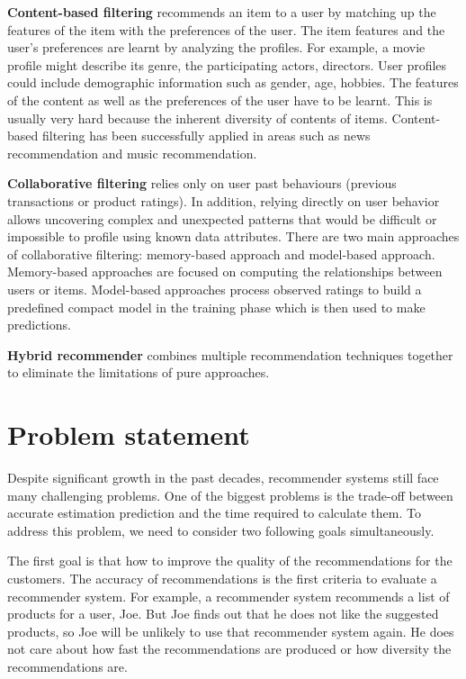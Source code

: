 \documentclass[oneside,13pt]{extreport}
\begin{document}
\begin{description}
    \item{\textbf{Content-based filtering}} recommends an item to a user by matching up the features of the item with the preferences of the user. The item features and the user's preferences are learnt by analyzing the profiles. For example, a movie profile might describe its genre, the participating actors, directors. User profiles could include demographic information such as gender, age, hobbies. The features of the content as well as the preferences of the user have to be learnt. This is usually very hard because the inherent diversity of contents of items. Content-based filtering has been successfully applied in areas such as news recommendation and music recommendation.
    \item{\textbf{Collaborative filtering}} relies only on user past behaviours (previous transactions or product ratings). In addition, relying directly on user behavior allows uncovering complex and unexpected patterns that would be difficult or impossible to profile using known data attributes\cite{BellKorFactor}. There are two main approaches of collaborative filtering: memory-based approach and model-based approach. Memory-based approaches are focused on computing the relationships between users or items. Model-based approaches process observed ratings to build a predefined compact model in the training phase which is then used to make predictions.
    \item{\textbf{Hybrid recommender}} combines multiple recommendation techniques together to eliminate the limitations of pure approaches\cite{TranHybrib}.
\end{description}


\section{Problem statement}
Despite significant growth in the past decades, recommender systems still face many challenging problems. One of the biggest problems is the trade-off between accurate estimation prediction and the time required to calculate them.  To address this problem, we need to consider two following goals simultaneously.

The first goal is that how to improve the quality of the recommendations for the customers. The accuracy of recommendations is the first criteria to evaluate a recommender system. For example, a recommender system recommends a list of products for a user, Joe. But Joe finds out that he does not like the suggested products, so Joe will be unlikely to use that recommender system again. He does not care about how fast the recommendations are produced or how diversity the recommendations are.
\end{document}
